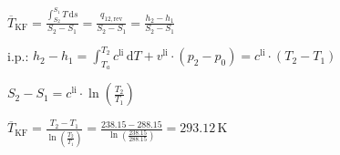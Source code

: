 \( \overline{T}_{\text{KF}} = \frac{\int_{S_2}^{S_1} T \, \text{d}s}{S_2 - S_1} = \frac{q_{12,\text{rev}}}{S_2 - S_1} = \frac{h_2 - h_1}{S_2 - S_1} \)  

i.p.: \( h_2 - h_1 = \int_{T_a}^{T_2} c^{\text{li}} \, \text{d}T + v^{\text{li}} \cdot (p_2 - p_0) = c^{\text{li}} \cdot (T_2 - T_1) \)  

\( S_2 - S_1 = c^{\text{li}} \cdot \ln \left( \frac{T_2}{T_1} \right) \)  

\( \overline{T}_{\text{KF}} = \frac{T_2 - T_1}{\ln \left( \frac{T_2}{T_1} \right)} = \frac{238.15 - 288.15}{\ln \left( \frac{238.15}{288.15} \right)} = 293.12 \, \text{K} \)